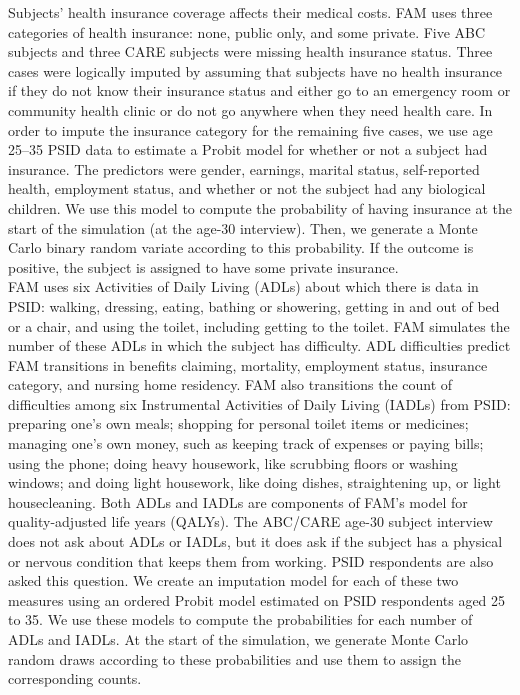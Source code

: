 \noindent Subjects' health insurance coverage affects their medical costs.
FAM uses three categories of health insurance: none, public only, and some private.
Five ABC subjects and three CARE subjects were missing health insurance status.
Three cases were logically imputed by assuming that subjects have no health insurance if they do not know their insurance status and either go to an emergency room or community health clinic or do not go anywhere when they need health care.
In order to impute the insurance category for the remaining five cases, we use age 25--35 PSID data to estimate a Probit model for whether or not a subject had insurance.
The predictors were gender, earnings, marital status, self-reported health, employment status, and whether or not the subject had any biological children.
We use this model to compute the probability of having insurance at the start of the simulation (at the age-30 interview).
Then, we generate a Monte Carlo binary random variate according to this probability.
If the outcome is positive, the subject is assigned to have some private insurance. \\

\noindent FAM uses six Activities of Daily Living (ADLs) about which there is data in PSID: walking, dressing, eating, bathing or showering, getting in and out of bed or a chair, and using the toilet, including getting to the toilet.
FAM simulates the number of these ADLs in which the subject has difficulty.
ADL difficulties predict FAM transitions in benefits claiming, mortality, employment status, insurance category, and nursing home residency.
FAM also transitions the count of difficulties among six Instrumental Activities of Daily Living (IADLs) from PSID: preparing one's own meals; shopping for personal toilet items or medicines; managing one's own money, such as keeping track of expenses or paying bills; using the phone; doing heavy housework, like scrubbing floors or washing windows; and doing light housework, like doing dishes, straightening up, or light housecleaning.
Both ADLs and IADLs are components of FAM's model for quality-adjusted life years (QALYs).
The ABC/CARE age-30 subject interview does not ask about ADLs or IADLs, but it does ask if the subject has a physical or nervous condition that keeps them from working.
PSID respondents are also asked this question.
We create an imputation model for each of these two measures using an ordered Probit model estimated on PSID respondents aged 25 to 35.
We use these models to compute the probabilities for each number of ADLs and IADLs. At the start of the simulation, we generate Monte Carlo random draws according to these probabilities and use them to assign the corresponding counts. \\

